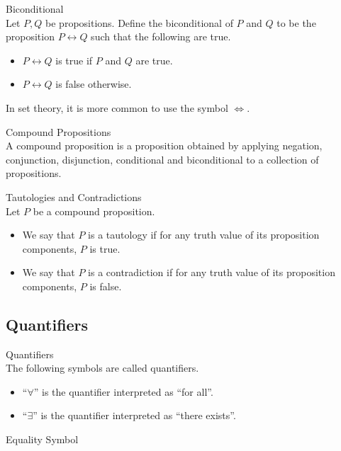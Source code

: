 \documentclass[a4paper]{article}
\begin{document}
\begin{defn}{Biconditional}{}\\
Let $P,Q$ be propositions. Define the biconditional of $P$ and $Q$ to be the proposition $P\leftrightarrow Q$ such that the following are true. 
\begin{itemize}
\item $P\leftrightarrow Q$ is true if $P$ and $Q$ are true. 
\item $P\leftrightarrow Q$ is false otherwise. 
\end{itemize}
\end{defn}

In set theory, it is more common to use the symbol $\iff$. 

\begin{defn}{Compound Propositions}{}\\
A compound proposition is a proposition obtained by applying negation, conjunction, disjunction, conditional and biconditional to a collection of propositions. 
\end{defn}

\begin{defn}{Tautologies and Contradictions}{}\\
Let $P$ be a compound proposition. 
\begin{itemize}
\item We say that $P$ is a tautology if for any truth value of its proposition components, $P$ is true. 
\item We say that $P$ is a contradiction if for any truth value of its proposition components, $P$ is false. 
\end{itemize}
\end{defn}

\subsection{Quantifiers}
\begin{defn}{Quantifiers}{}\\
The following symbols are called quantifiers. 
\begin{itemize}
\item ``$\forall$'' is the quantifier interpreted as ``for all''. 
\item ``$\exists$'' is the quantifier interpreted as ``there exists''. 
\end{itemize}
\end{defn}

\begin{defn}{Equality Symbol}{}
\end{defn}
\end{document}
